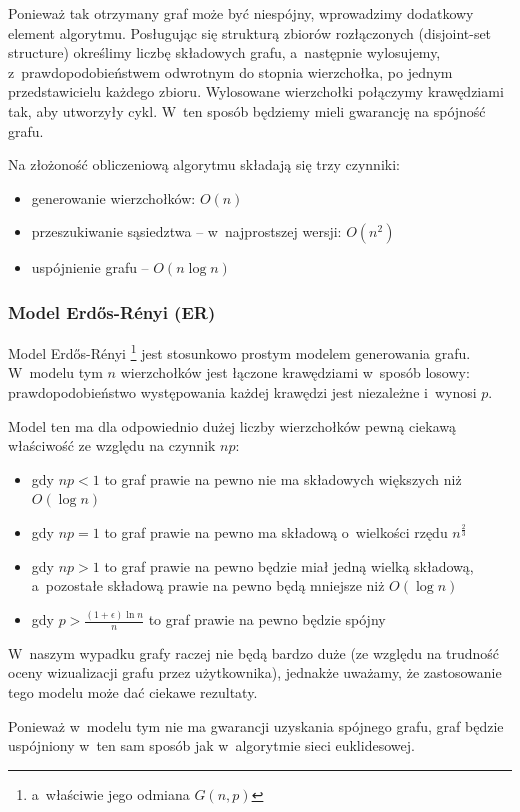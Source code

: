 \documentclass[a4paper,onecolumn,oneside,12pt]{mwart}
\begin{document}
Ponieważ tak otrzymany graf może być niespójny, wprowadzimy dodatkowy
element algorytmu. Posługując się strukturą zbiorów rozłączonych
(disjoint-set structure) określimy liczbę składowych grafu, a~następnie
wylosujemy, z~prawdopodobieństwem odwrotnym do stopnia wierzchołka, po jednym
przedstawicielu każdego zbioru. Wylosowane wierzchołki połączymy
krawędziami tak, aby utworzyły cykl. W~ten sposób będziemy mieli gwarancję
na spójność grafu.

Na złożoność obliczeniową algorytmu składają się trzy czynniki:
\begin{itemize}
	\item generowanie wierzchołków: $O(n)$
	\item przeszukiwanie sąsiedztwa -- w~najprostszej wersji: $O(n^2)$
	\item uspójnienie grafu -- $O(n\log{n})$
\end{itemize}

\subsubsection{Model Erd\H os-R\'enyi (ER)}

Model Erd\H os-R\'enyi \footnote{a~właściwie jego odmiana $G(n,p)$} jest
stosunkowo prostym modelem generowania grafu. W~modelu tym $n$ wierzchołków
jest łączone krawędziami w~sposób losowy: prawdopodobieństwo występowania
każdej krawędzi jest niezależne i~wynosi $p$.

Model ten ma dla odpowiednio dużej liczby wierzchołków pewną ciekawą
właściwość ze względu na czynnik $np$:
\begin{itemize}
	\item gdy $np < 1$ to graf prawie na pewno nie ma składowych większych
		niż $O(\log{n})$
	\item gdy $np = 1$ to graf prawie na pewno ma składową o~wielkości
		rzędu $n^\frac{2}{3}$
	\item gdy $np > 1$ to graf prawie na pewno będzie miał jedną wielką
		składową, a~pozostałe składową prawie na pewno będą mniejsze niż
		$O(\log{n})$
	\item gdy $p > \frac{(1+\epsilon)\ln{n}}{n}$ to graf prawie na pewno będzie
		spójny
\end{itemize}

W~naszym wypadku grafy raczej nie będą bardzo duże (ze względu na trudność
oceny wizualizacji grafu przez użytkownika), jednakże uważamy, że
zastosowanie tego modelu może dać ciekawe rezultaty.

Ponieważ w~modelu tym nie ma gwarancji uzyskania spójnego grafu, graf
będzie uspójniony w~ten sam sposób jak w~algorytmie sieci euklidesowej.
\end{document}
